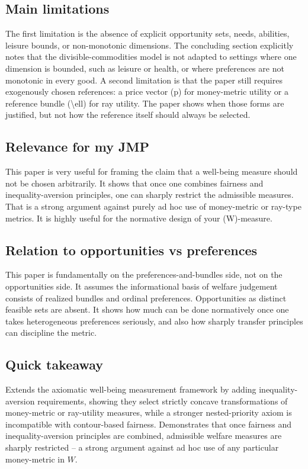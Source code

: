\documentclass[11pt,a4paper]{article}
\begin{document}
\subsection*{Main limitations}
The first limitation is the absence of explicit opportunity sets, needs, abilities, leisure bounds, or non-monotonic dimensions. The concluding section explicitly notes that the divisible-commodities model is not adapted to settings where one dimension is bounded, such as leisure or health, or where preferences are not monotonic in every good. A second limitation is that the paper still requires exogenously chosen references: a price vector (p) for money-metric utility or a reference bundle (\textbackslash{}ell) for ray utility. The paper shows when those forms are justified, but not how the reference itself should always be selected.

\subsection*{Relevance for my JMP}
This paper is very useful for framing the claim that a well-being measure should not be chosen arbitrarily. It shows that once one combines fairness and inequality-aversion principles, one can sharply restrict the admissible measures. That is a strong argument against purely ad hoc use of money-metric or ray-type metrics. It is highly useful for the normative design of your (W)-measure.

\subsection*{Relation to opportunities vs preferences}
This paper is fundamentally on the preferences-and-bundles side, not on the opportunities side. It assumes the informational basis of welfare judgement consists of realized bundles and ordinal preferences. Opportunities as distinct feasible sets are absent. It shows how much can be done normatively once one takes heterogeneous preferences seriously, and also how sharply transfer principles can discipline the metric.

\subsection*{Quick takeaway}
Extends the axiomatic well-being measurement framework by adding inequality-aversion requirements, showing they select strictly concave transformations of money-metric or ray-utility measures, while a stronger nested-priority axiom is incompatible with contour-based fairness. Demonstrates that once fairness and inequality-aversion principles are combined, admissible welfare measures are sharply restricted -- a strong argument against ad hoc use of any particular money-metric in $W$.
\end{document}
